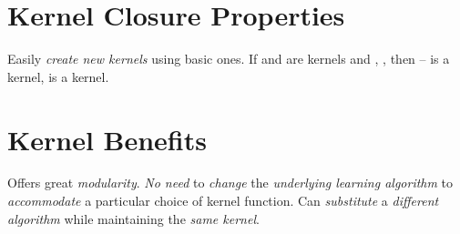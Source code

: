 \documentclass[
	exam={Midterm}
]{cs584exam}
\begin{document}
%
%
%

\section{Kernel Closure Properties}\label{sec:kernel-closure-properties}
Easily \emph{create new kernels} using basic ones.
If  and  are kernels and , , then --
 is a kernel,
 is a kernel.

\section{Kernel Benefits}\label{sec:kernel-benefits}
Offers great \emph{modularity}.
\emph{No need} to \emph{change} the \emph{underlying learning algorithm} to \emph{accommodate} a particular choice of kernel function.
Can \emph{substitute} a \emph{different algorithm} while maintaining the \emph{same kernel}.
\end{document}
